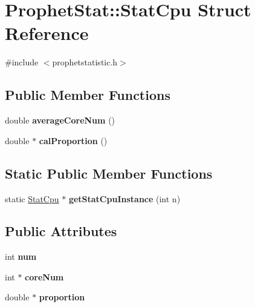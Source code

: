 \hypertarget{structProphetStat_1_1StatCpu}{
\section{ProphetStat::StatCpu Struct Reference}
\label{structProphetStat_1_1StatCpu}
}


{\ttfamily \#include $<$prophetstatistic.h$>$}

\subsection*{Public Member Functions}
\begin{DoxyCompactItemize}
\item 
\hypertarget{structProphetStat_1_1StatCpu_a6e4ce4ed546daef76b87825bc2b4a52c}{
double {\bfseries averageCoreNum} ()}
\label{structProphetStat_1_1StatCpu_a6e4ce4ed546daef76b87825bc2b4a52c}

\item 
\hypertarget{structProphetStat_1_1StatCpu_a9fba1d4e54315792e05bc32ff3908e6e}{
double $\ast$ {\bfseries calProportion} ()}
\label{structProphetStat_1_1StatCpu_a9fba1d4e54315792e05bc32ff3908e6e}

\end{DoxyCompactItemize}
\subsection*{Static Public Member Functions}
\begin{DoxyCompactItemize}
\item 
\hypertarget{structProphetStat_1_1StatCpu_a8bcebe874f1f2281914831c2f29e7b94}{
static \hyperlink{structProphetStat_1_1StatCpu}{StatCpu} $\ast$ {\bfseries getStatCpuInstance} (int n)}
\label{structProphetStat_1_1StatCpu_a8bcebe874f1f2281914831c2f29e7b94}

\end{DoxyCompactItemize}
\subsection*{Public Attributes}
\begin{DoxyCompactItemize}
\item 
\hypertarget{structProphetStat_1_1StatCpu_a17060d381054d9f4cfde5e45a1a68801}{
int {\bfseries num}}
\label{structProphetStat_1_1StatCpu_a17060d381054d9f4cfde5e45a1a68801}

\item 
\hypertarget{structProphetStat_1_1StatCpu_a0ce6afabe767f77c09c722ee0ed2f5f2}{
int $\ast$ {\bfseries coreNum}}
\label{structProphetStat_1_1StatCpu_a0ce6afabe767f77c09c722ee0ed2f5f2}

\item 
\hypertarget{structProphetStat_1_1StatCpu_a5d8ad59ddc734b1bb5df2bb9340ff045}{
double $\ast$ {\bfseries proportion}}
\label{structProphetStat_1_1StatCpu_a5d8ad59ddc734b1bb5df2bb9340ff045}

\end{DoxyCompactItemize}
